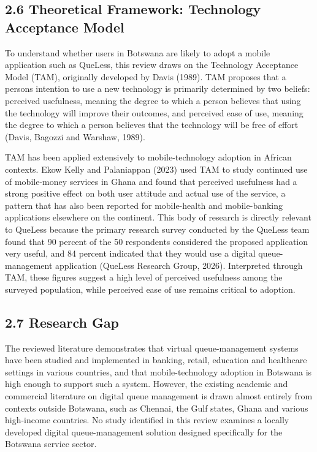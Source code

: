 \documentclass[
]{article}
\begin{document}
\subsection{2.6 Theoretical Framework: Technology Acceptance
Model}\label{theoretical-framework-technology-acceptance-model}

To understand whether users in Botswana are likely to adopt a mobile
application such as QueLess, this review draws on the Technology
Acceptance Model (TAM), originally developed by Davis (1989). TAM
proposes that a person\textquotesingle s intention to use a new
technology is primarily determined by two beliefs: perceived usefulness,
meaning the degree to which a person believes that using the technology
will improve their outcomes, and perceived ease of use, meaning the
degree to which a person believes that the technology will be free of
effort (Davis, Bagozzi and Warshaw, 1989).

TAM has been applied extensively to mobile-technology adoption in
African contexts. Ekow Kelly and Palaniappan (2023) used TAM to study
continued use of mobile-money services in Ghana and found that perceived
usefulness had a strong positive effect on both user attitude and actual
use of the service, a pattern that has also been reported for
mobile-health and mobile-banking applications elsewhere on the
continent. This body of research is directly relevant to QueLess because
the primary research survey conducted by the QueLess team found that 90
percent of the 50 respondents considered the proposed application very
useful, and 84 percent indicated that they would use a digital
queue-management application (QueLess Research Group, 2026). Interpreted
through TAM, these figures suggest a high level of perceived usefulness
among the surveyed population, while perceived ease of use remains
critical to adoption.

\subsection{2.7 Research Gap}\label{research-gap}

The reviewed literature demonstrates that virtual queue-management
systems have been studied and implemented in banking, retail, education
and healthcare settings in various countries, and that mobile-technology
adoption in Botswana is high enough to support such a system. However,
the existing academic and commercial literature on digital queue
management is drawn almost entirely from contexts outside Botswana, such
as Chennai, the Gulf states, Ghana and various high-income countries. No
study identified in this review examines a locally developed digital
queue-management solution designed specifically for the Botswana service
sector.
\end{document}
